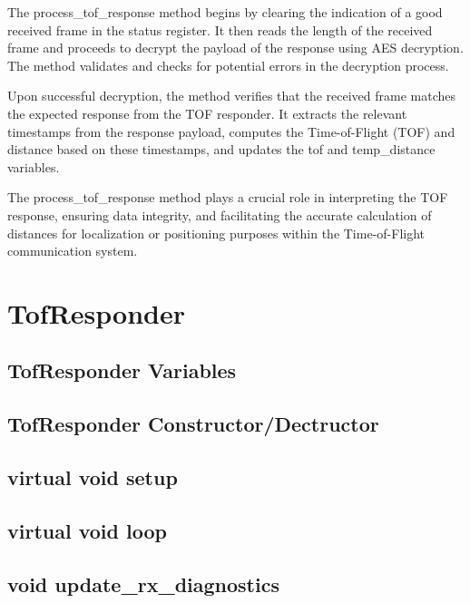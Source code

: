 The process\_tof\_response method begins by clearing the indication of a good received frame in the status register. It then reads the length of the received frame and proceeds to decrypt the payload of the response using AES decryption. The method validates and checks for potential errors in the decryption process.

Upon successful decryption, the method verifies that the received frame matches the expected response from the TOF responder. It extracts the relevant timestamps from the response payload, computes the Time-of-Flight (TOF) and distance based on these timestamps, and updates the tof and temp\_distance variables.

The process\_tof\_response method plays a crucial role in interpreting the TOF response, ensuring data integrity, and facilitating the accurate calculation of distances for localization or positioning purposes within the Time-of-Flight communication system.


\section{TofResponder}
\label{sec:TofResponder}

\subsection{TofResponder Variables}
\label{subsec:TofResponder_Variables}

\subsection{TofResponder Constructor/Dectructor}
\label{subsec:TofResponder_Constructor}

\subsection{virtual void setup}
\label{subsec:TofResponder_setup}

\subsection{virtual void loop}
\label{subsec:TofResponder_loop}

\subsection{void update\_rx\_diagnostics}
\label{subsec:TofResponder_update_rx_diagnostics}

